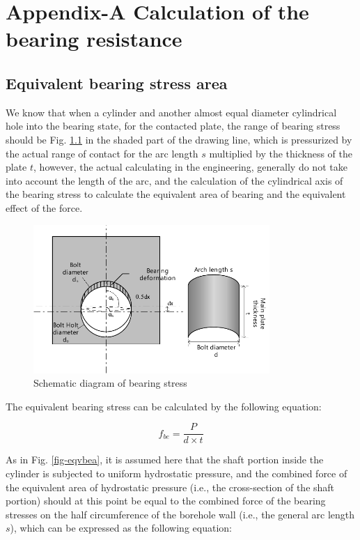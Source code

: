 \chapter{Appendix-A Calculation of the bearing resistance}
\label{app1}
\onehalfspacing



\section{Equivalent bearing stress area}

We know that when a cylinder and another almost equal diameter cylindrical hole into the bearing state, for the contacted plate, the range of bearing stress should be Fig. \ref{fig-shce-bea} in the shaded part of the drawing line, which is pressurized by the actual range of contact for the arc length $s$ multiplied by the thickness of the plate $t$, however, the actual calculating in the engineering, generally do not take into account the length of the arc, and the calculation of the cylindrical axis of the bearing stress to calculate the equivalent area of bearing and the equivalent effect of the force.

\begin{figure}[htbp]
    \centering
    \includegraphics[width=0.8\textwidth]{imgs/app/shce-bea.pdf}
    \caption{Schematic diagram of bearing stress}
    \label{fig-shce-bea}
\end{figure}

The equivalent bearing stress can be calculated by the following equation:

\begin{equation}
    f_{be} = \frac{P}{d \times t}
\end{equation}


As in Fig. \ref{fig-eqvbea}, it is assumed here that the shaft portion inside the cylinder is subjected to uniform hydrostatic pressure, and the combined force of the equivalent area of hydrostatic pressure (i.e., the cross-section of the shaft portion) should at this point be equal to the combined force of the bearing stresses on the half circumference of the borehole wall (i.e., the general arc length $s$), which can be expressed as the following equation:

